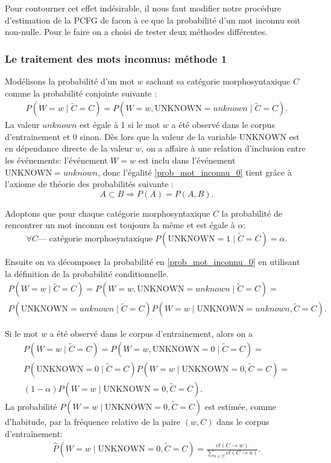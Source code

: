 \documentclass[12pt]{article}
\begin{document}
Pour contourner cet effet ind\'esirable, il nous faut modifier notre proc\'edure
d'estimation de la PCFG de facon \`a ce que la probabilit\'e d'un mot inconnu
soit non-nulle. Pour le faire on a choisi de tester deux m\'ethodes diff\'erentes.

\subsubsection{Le traitement des mots inconnus: m\'ethode 1}

Mod\'elisons la probabilit\'e d'un mot $w$ sachant sa cat\'egorie morphosyntaxique
$C$ comme la probabilit\'e conjointe suivante :
\begin{eqnarray}
\label{prob_mot_inconnu_0}
 P(W = w \mid \tilde{C} = C) = P(W = w, \mathrm{UNKNOWN} = unknown \mid \tilde{C} = C).
\end{eqnarray}
La valeur $unknown$ est \'egale \`a 1 si le mot $w$ a \'et\'e observ\'e dans le
corpus d'entrainement et 0 sinon. D\`es lors que la valeur de la variable
$\mathrm{UNKNOWN}$ est en d\'ependance directe de la valeur $w$, on a affaire \`a
une relation d'inclusion entre les \'ev\'enements: l'\'ev\'enement $W = w$ est
inclu dans l'\'ev\'enement $\mathrm{UNKNOWN} = unknown$, donc l'\'egalit\'e
\ref{prob_mot_inconnu_0} tient gr\^ace \`a l'axiome de th\'eorie des probabilit\'es
suivante :
$$ A \subset B \Rightarrow P(A) = P(A,B).$$

Adoptons que pour chaque cat\'egorie morphosyntaxique $C$ la probabilit\'e de
rencontrer un mot inconnu est toujours la m\^eme et est \'egale \`a $\alpha$:
$$ \forall C \text{--- cat\'egorie morphosyntaxique} \; P(\mathrm{UNKNOWN} = 1 \mid \tilde{C} = C) = \alpha.$$

Ensuite on va d\'ecomposer la probabilit\'e en \ref{prob_mot_inconnu_0} en
utilisant la d\'efinition de la probabilit\'e conditionnelle.
\begin{multline}
\label{prob_mot_inconnu_cond}
 P(W = w \mid \tilde{C} = C) = P(W = w, \mathrm{UNKNOWN} = unknown \mid
 \tilde{C} = C) = \\ P(\mathrm{UNKNOWN} = unknown \mid \tilde{C} = C) P(W = w \mid \mathrm{UNKNOWN} = unknown , \tilde{C} = C).
\end{multline}

 Si le mot $w$ a \'et\'e observ\'e dans le corpus d'entrainement, alors on a
\begin{multline}
\label{prob_mot_connu_1}
 P(W = w \mid \tilde{C} = C) = P(W = w, \mathrm{UNKNOWN} = 0 \mid \tilde{C} = C)
 = \\ P(\mathrm{UNKNOWN} = 0 \mid \tilde{C} = C) P(W = w \mid \mathrm{UNKNOWN} =
 0, \tilde{C} = C) = \\ (1 - \alpha) P(W = w \mid \mathrm{UNKNOWN} = 0, \tilde{C} = C).
\end{multline}
La probabilit\'e $P(W = w \mid \mathrm{UNKNOWN} = 0, \tilde{C} = C)$ est estim\'ee,
comme d'habitude, par la fr\'equence relative de la paire $(w, C)$ dans le corpus
d'entra\^inement:
\begin{eqnarray*}
\hat{P}(W = w \mid \mathrm{UNKNOWN} = 0, \tilde{C} = C) =
\frac{ct(C \rightarrow w)}{\sum\limits_{a \in \Sigma}{ct(C \rightarrow a)}}.
\end{eqnarray*}
\end{document}

